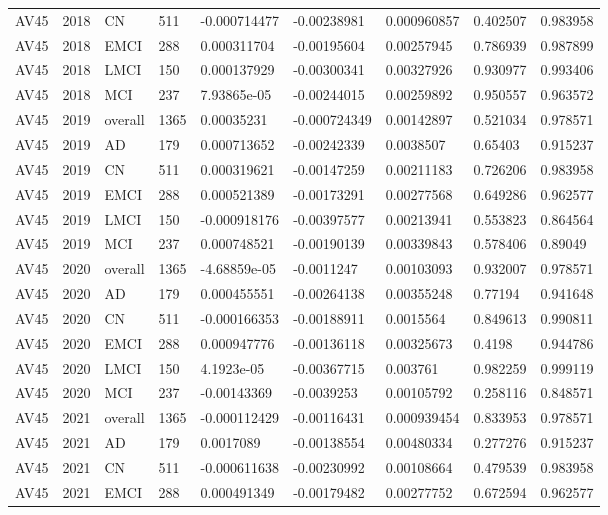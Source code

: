 \begin{landscape}
\begin{longtable}{lllllllll}
AV45 & 2018 & CN & 511 & -0.000714477 & -0.00238981 & 0.000960857 & 0.402507 & 0.983958 \\
AV45 & 2018 & EMCI & 288 & 0.000311704 & -0.00195604 & 0.00257945 & 0.786939 & 0.987899 \\
AV45 & 2018 & LMCI & 150 & 0.000137929 & -0.00300341 & 0.00327926 & 0.930977 & 0.993406 \\
AV45 & 2018 & MCI & 237 & 7.93865e-05 & -0.00244015 & 0.00259892 & 0.950557 & 0.963572 \\
AV45 & 2019 & overall & 1365 & 0.00035231 & -0.000724349 & 0.00142897 & 0.521034 & 0.978571 \\
AV45 & 2019 & AD & 179 & 0.000713652 & -0.00242339 & 0.0038507 & 0.65403 & 0.915237 \\
AV45 & 2019 & CN & 511 & 0.000319621 & -0.00147259 & 0.00211183 & 0.726206 & 0.983958 \\
AV45 & 2019 & EMCI & 288 & 0.000521389 & -0.00173291 & 0.00277568 & 0.649286 & 0.962577 \\
AV45 & 2019 & LMCI & 150 & -0.000918176 & -0.00397577 & 0.00213941 & 0.553823 & 0.864564 \\
AV45 & 2019 & MCI & 237 & 0.000748521 & -0.00190139 & 0.00339843 & 0.578406 & 0.89049 \\
AV45 & 2020 & overall & 1365 & -4.68859e-05 & -0.0011247 & 0.00103093 & 0.932007 & 0.978571 \\
AV45 & 2020 & AD & 179 & 0.000455551 & -0.00264138 & 0.00355248 & 0.77194 & 0.941648 \\
AV45 & 2020 & CN & 511 & -0.000166353 & -0.00188911 & 0.0015564 & 0.849613 & 0.990811 \\
AV45 & 2020 & EMCI & 288 & 0.000947776 & -0.00136118 & 0.00325673 & 0.4198 & 0.944786 \\
AV45 & 2020 & LMCI & 150 & 4.1923e-05 & -0.00367715 & 0.003761 & 0.982259 & 0.999119 \\
AV45 & 2020 & MCI & 237 & -0.00143369 & -0.0039253 & 0.00105792 & 0.258116 & 0.848571 \\
AV45 & 2021 & overall & 1365 & -0.000112429 & -0.00116431 & 0.000939454 & 0.833953 & 0.978571 \\
AV45 & 2021 & AD & 179 & 0.0017089 & -0.00138554 & 0.00480334 & 0.277276 & 0.915237 \\
AV45 & 2021 & CN & 511 & -0.000611638 & -0.00230992 & 0.00108664 & 0.479539 & 0.983958 \\
AV45 & 2021 & EMCI & 288 & 0.000491349 & -0.00179482 & 0.00277752 & 0.672594 & 0.962577 \\

\end{longtable}
\end{landscape}
